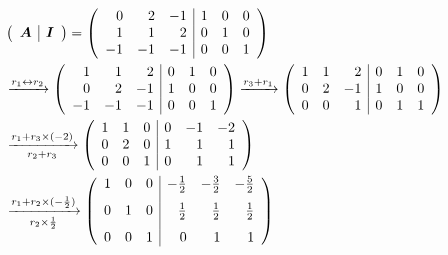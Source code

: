 \begin{frame}
\begin{jie}

$$
\begin{aligned}
&\left(
  \begin{array}{c|c}
    \boldsymbol{A} & \boldsymbol{I}
  \end{array}
\right)=\left(
  \begin{array}{rrr|rrr}
    0 &  2 & -1 &  1 & 0 & 0\\
    1 &  1 &  2 &  0 & 1 & 0\\
    -1 & -1 & -1 &  0 & 0 & 1\\              
  \end{array}
\right) \\ 
&\xrightarrow[]{r_1\leftrightarrow r_2}\left(
  \begin{array}{rrr|rrr}
    1 &  1 &  2 &  0 & 1 & 0\\
    0 &  2 & -1 &  1 & 0 & 0\\
    -1 & -1 & -1 &  0 & 0 & 1\\          
  \end{array}
\right) 
\xrightarrow[]{r_3+ r_1}\left(
  \begin{array}{rrr|rrr}
    1 &  1 &  2 & 0 & 1 & 0\\
    0 &  2 & -1 & 1 & 0 & 0\\
    0 &  0 &  1 & 0 & 1 & 1\\          
  \end{array}
\right)\\
&\xrightarrow[r_2+r_3]{r_1+ r_3\times(-2)}\left(
  \begin{array}{rrr|rrr}
    1 &  1 &  0  & 0 &-1 &-2\\
    0 &  2 &  0  & 1 & 1 & 1\\
    0 &  0 &  1  & 0 & 1 & 1\\    
  \end{array}
\right)\\
&\xrightarrow[r_2\times \frac12]{r_1+ r_2\times(-\frac12)}\left(
  \begin{array}{rrr|rrr}
    1 &  0 &  0  & -\frac12 &-\frac32 &-\frac52\\[.1in]
    0 &  1 &  0  & \frac12 & \frac12 & \frac12 \\[.1in]
    0 &  0 &  1  & 0 & 1 & 1                   
  \end{array}
\right)    
\end{aligned}
$$
\end{jie}
\end{frame}


